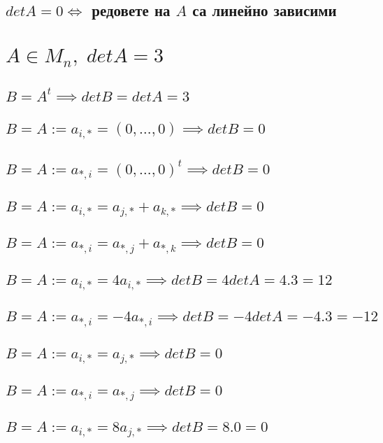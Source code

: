 \documentclass{article}
\begin{document}
    \subsection{\(detA = 0 \iff\) редовете на \(A\) са линейно зависими}
    \section{\(A \in M_n, \; detA = 3\)}
    \subsection{\(B = A^t \implies detB = detA = 3\)}
    \subsection{\(B = A := a_{i,*} = (0, \dots, 0) \implies detB = 0\)}
    \subsection{\(B = A := a_{*,i} = (0, \dots, 0)^t \implies detB = 0\)}
    \subsection{\(B = A := a_{i,*} = a_{j,*} + a_{k,*} \implies detB = 0\)}
    \subsection{\(B = A := a_{*,i} = a_{*,j} + a_{*,k} \implies detB = 0\)}
    \subsection{\(B = A := a_{i,*} = 4a_{i,*} \implies detB = 4detA = 4.3 = 12\)}
    \subsection{\(B = A := a_{*,i} = -4a_{*,i} \implies detB = -4detA = -4.3 = -12\)}
    \subsection{\(B = A := a_{i,*} = a_{j,*} \implies detB = 0\)}
    \subsection{\(B = A := a_{*,i} = a_{*,j} \implies detB = 0\)}
    \subsection{\(B = A := a_{i,*} = 8a_{j,*} \implies detB = 8.0 = 0\)}
\end{document}
